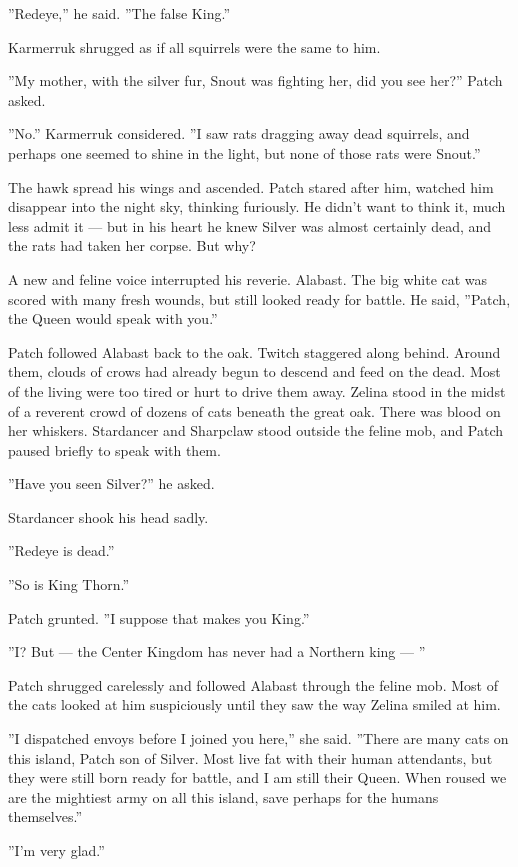 \documentclass[12pt]{book}
\begin{document}
''Redeye,'' he said. ''The false King.''

Karmerruk shrugged as if all squirrels were the same to him.

''My mother, with the silver fur, Snout was fighting her, did you see her?'' Patch asked.

''No.'' Karmerruk considered. ''I saw rats dragging away dead squirrels, and perhaps one seemed to shine in the light, but none of those rats were Snout.''

The hawk spread his wings and ascended. Patch stared after him, watched him disappear into the night sky, thinking furiously. He didn't want to think it, much less admit it ---
but in his heart he knew Silver was almost certainly dead, and the rats had taken her corpse. But why?

A new and feline voice interrupted his reverie. Alabast. The big white cat was scored with many fresh wounds, but still looked ready for battle. He said, ''Patch, the Queen would speak with you.''

Patch followed Alabast back to the oak. Twitch staggered along behind. Around them, clouds of crows had already begun to descend and feed on the dead. Most of the living were too tired or hurt to drive them away. Zelina stood in the midst of a reverent crowd of dozens of cats beneath the great oak. There was blood on her whiskers. Stardancer and Sharpclaw stood outside the feline mob, and Patch paused briefly to speak with them.

''Have you seen Silver?'' he asked.

Stardancer shook his head sadly.

''Redeye is dead.''

''So is King Thorn.''

Patch grunted. ''I suppose that makes you King.''

''I? But ---
the Center Kingdom has never had a Northern king ---
''

Patch shrugged carelessly and followed Alabast through the feline mob. Most of the cats looked at him suspiciously until they saw the way Zelina smiled at him.

''I dispatched envoys before I joined you here,'' she said. ''There are many cats on this island, Patch son of Silver. Most live fat with their human attendants, but they were still born ready for battle, and I am still their Queen. When roused we are the mightiest army on all this island, save perhaps for the humans themselves.''

''I'm very glad.''
\end{document}
